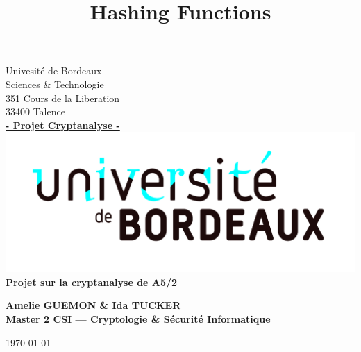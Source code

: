 \documentclass[a4paper]{article}
\title{Hashing Functions}
\author{}
\begin{document}
\begin{titlepage}
  \begin{sffamily}
  \begin{center}

    Univesité de Bordeaux\\ Sciences \& Technologie\\
           351 Cours de la Liberation\\33400 Talence\\[1em]
            \textbf{\underline{- Projet Cryptanalyse -}}\\[1.5cm]
           
    \includegraphics[scale=0.11]{UB.jpg}
    \\[3cm]

    { \huge \bfseries Projet sur la cryptanalyse de A5/2\\[0.5cm] }
    \begin{flushright}
      \bfseries {Amelie GUEMON \& Ida TUCKER\\[1em]Master 2 CSI --- Cryptologie \& Sécurité Informatique}\\[6.6cm]
    \end{flushright}
    
   
    \today

  \end{center}
  \end{sffamily}
\end{titlepage}













\nocite{*}
\end{document}

